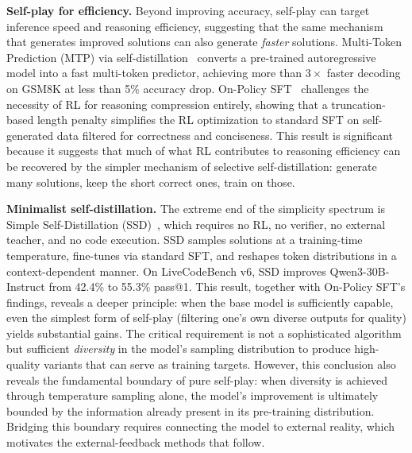 \documentclass{article} %
\begin{document}
\textbf{Self-play for efficiency.}
Beyond improving accuracy, self-play can target inference speed and reasoning efficiency, suggesting that the same mechanism that generates improved solutions can also generate \emph{faster} solutions. Multi-Token Prediction (MTP) via self-distillation~\citep{2602.06019} converts a pre-trained autoregressive model into a fast multi-token predictor, achieving more than $3\times$ faster decoding on GSM8K at less than 5\% accuracy drop. On-Policy SFT~\citep{zhao2026onpolicy} challenges the necessity of RL for reasoning compression entirely, showing that a truncation-based length penalty simplifies the RL optimization to standard SFT on self-generated data filtered for correctness and conciseness. This result is significant because it suggests that much of what RL contributes to reasoning efficiency can be recovered by the simpler mechanism of selective self-distillation: generate many solutions, keep the short correct ones, train on those.

\textbf{Minimalist self-distillation.}
The extreme end of the simplicity spectrum is Simple Self-Distillation (SSD)~\citep{zhang2026embarrassingly}, which requires no RL, no verifier, no external teacher, and no code execution. SSD samples solutions at a training-time temperature, fine-tunes via standard SFT, and reshapes token distributions in a context-dependent manner. On LiveCodeBench v6, SSD improves Qwen3-30B-Instruct from 42.4\% to 55.3\% pass@1. This result, together with On-Policy SFT's findings, reveals a deeper principle: when the base model is sufficiently capable, even the simplest form of self-play (filtering one's own diverse outputs for quality) yields substantial gains. The critical requirement is not a sophisticated algorithm but sufficient \emph{diversity} in the model's sampling distribution to produce high-quality variants that can serve as training targets. However, this conclusion also reveals the fundamental boundary of pure self-play: when diversity is achieved through temperature sampling alone, the model's improvement is ultimately bounded by the information already present in its pre-training distribution. Bridging this boundary requires connecting the model to external reality, which motivates the external-feedback methods that follow.
\end{document}
